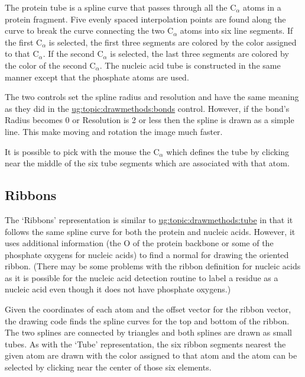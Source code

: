 The protein tube is a spline curve that passes through all the
C${}_\alpha$ atoms in a protein fragment.  Five evenly spaced interpolation
points are found along the curve to break the curve connecting the two
C${}_\alpha$ atoms into six line segments.  If the first C${}_\alpha$ is
selected, the first three segments are colored by the color assigned
to that C${}_\alpha$.  If the second C${}_\alpha$ is selected, the last
three segments are colored by the color of the second C${}_\alpha$.  The
nucleic acid tube is constructed in the same manner except that the
phosphate atoms are used.

The two controls set the spline radius and resolution and have the same
meaning as they did in the \hyperref{`Bond'}{`Bond'
[\S~}{]}{ug:topic:drawmethods:bonds} control.  However, if the bond's {\sf
Radius} becomes 0 or {\sf Resolution} is 2 or less then the spline is drawn
as a simple line.  This make moving and rotation the image much faster.

It is possible to pick with the mouse the C${}_\alpha$ which defines the
tube by clicking near the middle of the six tube segments which are
associated with that atom. 



\subsection{Ribbons}
\label{ug:topic:drawmethods:ribbons}
The `Ribbons' representation is similar to \hyperref{`Tube'}{`Tube'
[\S~}{]}{ug:topic:drawmethods:tube} in that it follows the same spline curve
for both the protein and nucleic acids.  However, it uses additional
information (the O of the protein backbone or some of the phosphate oxygens
for nucleic acids) to find a normal for drawing the oriented ribbon.  (There
may be some problems with the ribbon definition for nucleic acids as it is
possible for the nucleic acid detection routine to label a residue as a
nucleic acid even though it does not have phosphate oxygens.)

Given the coordinates of each atom and the offset vector for the
ribbon vector, the drawing code finds the spline curves for the top
and bottom of the ribbon.  The two splines are connected by triangles
and both splines are drawn as small tubes.  As with the `Tube'
representation, the six ribbon segments nearest the given atom are
drawn with the color assigned to that atom and the atom can be
selected by clicking near the center of those six elements.

